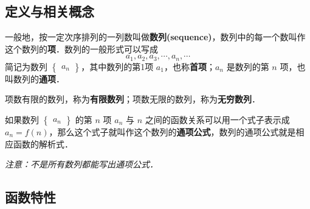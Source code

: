 
\begin{issues}
\issueDraft
\end{issues}

\subsection{定义与相关概念}
一般地，按一定次序排列的一列数叫做\textbf{数列(sequence)}，数列中的每一个数叫作这个数列的\textbf{项}．数列的一般形式可以写成
\begin{equation}
a_1,a_2,a_3,\cdots,a_n,\cdots
\end{equation}
简记为数列 $\begin{Bmatrix} a_n \end{Bmatrix}$，其中数列的第1项 $a_1$，也称\textbf{首项}；$a_n$ 是数列的第 $n$ 项，也叫数列的\textbf{通项}．

项数有限的数列，称为\textbf{有限数列}；项数无限的数列，称为\textbf{无穷数列}．

如果数列 $\begin{Bmatrix} a_n \end{Bmatrix}$ 的第 $n$ 项 $a_n$ 与 $n$ 之间的函数关系可以用一个式子表示成 $a_n = f(n)$，那么这个式子就叫作这个数列的\textbf{通项公式}，数列的通项公式就是相应函数的解析式．

\textsl{注意：不是所有数列都能写出通项公式．}

\subsection{函数特性}
